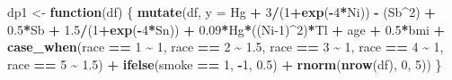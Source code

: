 \documentclass[12pt, twoside]{amherstthesis}
\newenvironment{Shaded}{\begin{snugshade}}{\end{snugshade}}
\newcommand{\AttributeTok}[1]{\textcolor[rgb]{0.13,0.29,0.53}{#1}}
\newcommand{\ControlFlowTok}[1]{\textcolor[rgb]{0.13,0.29,0.53}{\textbf{#1}}}
\newcommand{\DecValTok}[1]{\textcolor[rgb]{0.00,0.00,0.81}{#1}}
\newcommand{\FloatTok}[1]{\textcolor[rgb]{0.00,0.00,0.81}{#1}}
\newcommand{\FunctionTok}[1]{\textcolor[rgb]{0.13,0.29,0.53}{\textbf{#1}}}
\newcommand{\NormalTok}[1]{#1}
\newcommand{\OtherTok}[1]{\textcolor[rgb]{0.56,0.35,0.01}{#1}}
\newcommand{\SpecialCharTok}[1]{\textcolor[rgb]{0.81,0.36,0.00}{\textbf{#1}}}
\begin{document}
\begin{Shaded}
\begin{Highlighting}[]
\NormalTok{dp1 }\OtherTok{\textless{}{-}} \ControlFlowTok{function}\NormalTok{(df) \{}
  \FunctionTok{mutate}\NormalTok{(df, }\AttributeTok{y =} 
\NormalTok{           Hg }\SpecialCharTok{+} \DecValTok{3}\SpecialCharTok{/}\NormalTok{(}\DecValTok{1}\SpecialCharTok{+}\FunctionTok{exp}\NormalTok{(}\SpecialCharTok{{-}}\DecValTok{4}\SpecialCharTok{*}\NormalTok{Ni)) }\SpecialCharTok{{-}}\NormalTok{ (Sb}\SpecialCharTok{\^{}}\DecValTok{2}\NormalTok{) }\SpecialCharTok{+} \FloatTok{0.5}\SpecialCharTok{*}\NormalTok{Sb }\SpecialCharTok{+} \FloatTok{1.5}\SpecialCharTok{/}\NormalTok{(}\DecValTok{1}\SpecialCharTok{+}\FunctionTok{exp}\NormalTok{(}\SpecialCharTok{{-}}\DecValTok{4}\SpecialCharTok{*}\NormalTok{Sn)) }\SpecialCharTok{+} 
           \FloatTok{0.09}\SpecialCharTok{*}\NormalTok{Hg}\SpecialCharTok{*}\NormalTok{((Ni}\DecValTok{{-}1}\NormalTok{)}\SpecialCharTok{\^{}}\DecValTok{2}\NormalTok{)}\SpecialCharTok{*}\NormalTok{Tl }\SpecialCharTok{+}
\NormalTok{           age }\SpecialCharTok{+} \FloatTok{0.5}\SpecialCharTok{*}\NormalTok{bmi }\SpecialCharTok{+} 
           \FunctionTok{case\_when}\NormalTok{(race }\SpecialCharTok{==} \DecValTok{1} \SpecialCharTok{\textasciitilde{}} \DecValTok{1}\NormalTok{, }
\NormalTok{                     race }\SpecialCharTok{==} \DecValTok{2} \SpecialCharTok{\textasciitilde{}} \FloatTok{1.5}\NormalTok{, }
\NormalTok{                     race }\SpecialCharTok{==} \DecValTok{3} \SpecialCharTok{\textasciitilde{}} \DecValTok{1}\NormalTok{, }
\NormalTok{                     race }\SpecialCharTok{==} \DecValTok{4} \SpecialCharTok{\textasciitilde{}} \DecValTok{1}\NormalTok{, }
\NormalTok{                     race }\SpecialCharTok{==} \DecValTok{5} \SpecialCharTok{\textasciitilde{}} \FloatTok{1.5}\NormalTok{) }\SpecialCharTok{+}
           \FunctionTok{ifelse}\NormalTok{(smoke }\SpecialCharTok{==} \DecValTok{1}\NormalTok{, }\SpecialCharTok{{-}}\DecValTok{1}\NormalTok{, }\FloatTok{0.5}\NormalTok{) }\SpecialCharTok{+}
           \FunctionTok{rnorm}\NormalTok{(}\FunctionTok{nrow}\NormalTok{(df), }\DecValTok{0}\NormalTok{, }\DecValTok{5}\NormalTok{))}
\NormalTok{\}}


\end{Highlighting}
\end{Shaded}
\end{document}
